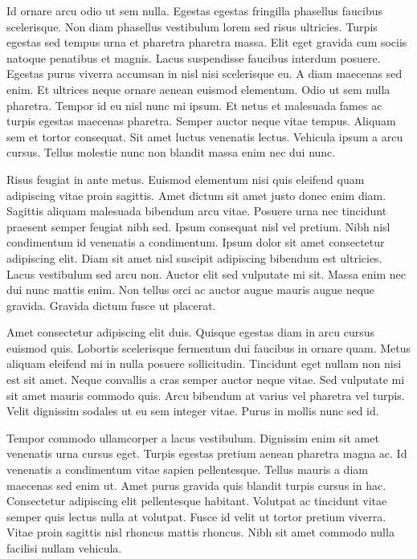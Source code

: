 \documentclass[11pt,a4paper]{article}
\begin{document}
Id ornare arcu odio ut sem nulla. Egestas egestas fringilla phasellus faucibus scelerisque. Non diam phasellus vestibulum lorem sed risus ultricies. Turpis egestas sed tempus urna et pharetra pharetra massa. Elit eget gravida cum sociis natoque penatibus et magnis. Lacus suspendisse faucibus interdum posuere. Egestas purus viverra accumsan in nisl nisi scelerisque eu. A diam maecenas sed enim. Et ultrices neque ornare aenean euismod elementum. Odio ut sem nulla pharetra. Tempor id eu nisl nunc mi ipsum. Et netus et malesuada fames ac turpis egestas maecenas pharetra. Semper auctor neque vitae tempus. Aliquam sem et tortor consequat. Sit amet luctus venenatis lectus. Vehicula ipsum a arcu cursus. Tellus molestie nunc non blandit massa enim nec dui nunc.

Risus feugiat in ante metus. Euismod elementum nisi quis eleifend quam adipiscing vitae proin sagittis. Amet dictum sit amet justo donec enim diam. Sagittis aliquam malesuada bibendum arcu vitae. Posuere urna nec tincidunt praesent semper feugiat nibh sed. Ipsum consequat nisl vel pretium. Nibh nisl condimentum id venenatis a condimentum. Ipsum dolor sit amet consectetur adipiscing elit. Diam sit amet nisl suscipit adipiscing bibendum est ultricies. Lacus vestibulum sed arcu non. Auctor elit sed vulputate mi sit. Massa enim nec dui nunc mattis enim. Non tellus orci ac auctor augue mauris augue neque gravida. Gravida dictum fusce ut placerat.

Amet consectetur adipiscing elit duis. Quisque egestas diam in arcu cursus euismod quis. Lobortis scelerisque fermentum dui faucibus in ornare quam. Metus aliquam eleifend mi in nulla posuere sollicitudin. Tincidunt eget nullam non nisi est sit amet. Neque convallis a cras semper auctor neque vitae. Sed vulputate mi sit amet mauris commodo quis. Arcu bibendum at varius vel pharetra vel turpis. Velit dignissim sodales ut eu sem integer vitae. Purus in mollis nunc sed id.

Tempor commodo ullamcorper a lacus vestibulum. Dignissim enim sit amet venenatis urna cursus eget. Turpis egestas pretium aenean pharetra magna ac. Id venenatis a condimentum vitae sapien pellentesque. Tellus mauris a diam maecenas sed enim ut. Amet purus gravida quis blandit turpis cursus in hac. Consectetur adipiscing elit pellentesque habitant. Volutpat ac tincidunt vitae semper quis lectus nulla at volutpat. Fusce id velit ut tortor pretium viverra. Vitae proin sagittis nisl rhoncus mattis rhoncus. Nibh sit amet commodo nulla facilisi nullam vehicula.
\end{document}
